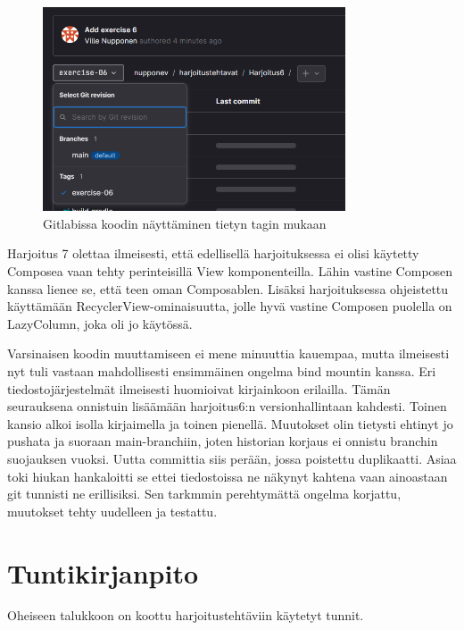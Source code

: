 \begin{figure}[!ht]
    \centering
    \includegraphics[width=0.8\textwidth]{figures/gitlab-change-branch-to-tag.png}
    \caption{Gitlabissa koodin näyttäminen tietyn tagin mukaan}
    \label{fig:gitlab-change-branch-to-tag}
\end{figure}

Harjoitus 7 olettaa ilmeisesti, että edellisellä harjoituksessa ei olisi
käytetty Composea vaan tehty perinteisillä View komponenteilla. Lähin vastine
Composen kanssa lienee se, että teen oman Composablen. Lisäksi harjoituksessa
ohjeistettu käyttämään RecyclerView-ominaisuutta, jolle hyvä vastine Composen
puolella on LazyColumn, joka oli jo käytössä.

Varsinaisen koodin muuttamiseen ei mene minuuttia kauempaa, mutta ilmeisesti
nyt tuli vastaan mahdollisesti ensimmäinen ongelma bind mountin kanssa. Eri
tiedostojärjestelmät ilmeisesti huomioivat kirjainkoon erilailla. Tämän
seurauksena onnistuin lisäämään harjoitus6:n versionhallintaan kahdesti. Toinen
kansio alkoi isolla kirjaimella ja toinen pienellä. Muutokset olin tietysti
ehtinyt jo pushata ja suoraan main-branchiin, joten historian korjaus ei
onnistu branchin suojauksen vuoksi. Uutta committia siis perään, jossa
poistettu duplikaatti. Asiaa toki hiukan hankaloitti se ettei tiedostoissa ne
näkynyt kahtena vaan ainoastaan git tunnisti ne erillisiksi. Sen tarkmmin
perehtymättä ongelma korjattu, muutokset tehty uudelleen ja testattu.

\section{Tuntikirjanpito}

Oheiseen talukkoon on koottu harjoitustehtäviin käytetyt tunnit.

